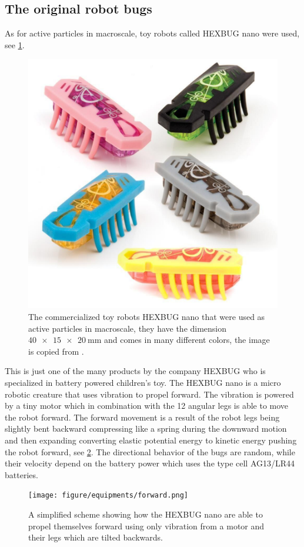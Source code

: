\subsection{The original robot bugs}

As for active particles in macroscale, toy robots called HEXBUG nano\textregistered\xspace were used, see \cref{fig:hexbug_nano}. 

\begin{figure}[htpb!]
    \centering
    \includegraphics[width=.3\textwidth]
    {figure/equipments/hexbug_nano.jpeg}
    \caption{The commercialized toy robots HEXBUG nano\textregistered\xspace that were used as active particles in 
    macroscale, they have the dimension $\SI[product-units = single]{40 x 15 x 20}{\milli\metre}$ 
    and comes in many different colors, the image is copied from \cite{hexbug}.}
    \label{fig:hexbug_nano}
\end{figure}


This is just one of the many products by the company HEXBUG who is specialized in battery powered children's toy. 
The HEXBUG nano\textregistered\xspace is a micro robotic creature that uses vibration to propel forward. The vibration 
is powered by a tiny motor which in combination with the 12 angular legs is able to move the robot forward. The forward 
movement is a result of the robot legs being slightly bent backward compressing like a spring during the downward motion 
and then expanding converting elastic potential energy to kinetic energy pushing the robot forward, see \cref{fig:forward}.
The directional behavior of the bugs are random, while their velocity depend on the battery power which uses 
the type cell AG13/LR44 batteries. 

\begin{figure}[htpb!]
    \centering
    \texttt{[image: figure/equipments/forward.png]}
    \caption{A simplified scheme showing how the HEXBUG nano\textregistered\xspace are able to propel 
    themselves forward using only vibration from a motor and their legs which are tilted backwards.}
    \label{fig:forward}
\end{figure}


